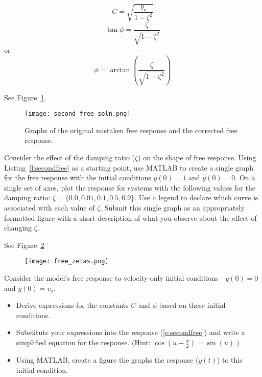 \ifsolutions
\begin{soln}
\[ C = \sqrt{\frac{y_o}{1-\zeta^2}} \]
\[ \tan\phi = \frac{\zeta}{\sqrt{1-\zeta^2}} \]
or 
\[ \phi = \arctan\left(\frac{\zeta}{\sqrt{1-\zeta^2}}\right) \]

See Figure~\ref{f:secondfreesoln}.

\begin{figure}[hbt]
\centering
\texttt{[image: second\_free\_soln.png]}
\caption{Graphs of the original mistaken free response and the corrected free response.}
\label{f:secondfreesoln}
\end{figure}
\end{soln}
\fi

\begin{ex}
Consider the effect of the damping ratio ($\zeta$) on the shape of free response.  Using Listing~\ref{l:secondfree} as a starting point, use MATLAB to create a single graph for the free response with the initial conditions $y(0)=1$ and $\dot{y}(0)=0$.  On a single set of axes, plot the response for systems with the following values for the damping ratio: $\zeta=\{0.0, 0.01 , 0.1, 0.5, 0.9\}$.  Use a legend to declare which curve is associated with each value of $\zeta$.  Submit this single graph as an appropriately formatted figure with a short description of what you observe about the effect of changing $\zeta$.
\end{ex}

\ifsolutions
\begin{soln}
See Figure~\ref{f:secondfreezetas}
\begin{figure}[hbt]
\centering
\texttt{[image: free\_zetas.png]}
\caption{}
\label{f:secondfreezetas}
\end{figure}

\end{soln}
\fi

\begin{ex}
Consider the model's free response to velocity-only initial conditions---$y(0)=0$ and $\dot{y}(0)=v_o$.
\begin{itemize}
\item Derive expressions for the constants $C$ and $\phi$ based on these initial conditions.
\item Substitute your expressions into the response (\ref{e:secondfree}) and write a simplified equation for the response.  (Hint: $\cos\left(u-\frac{\pi}{2}\right) = \sin(u)$.)
\item Using MATLAB, create a figure the graphs the response ($y(t)$) to this initial condition.
\end{itemize}
\end{ex}


